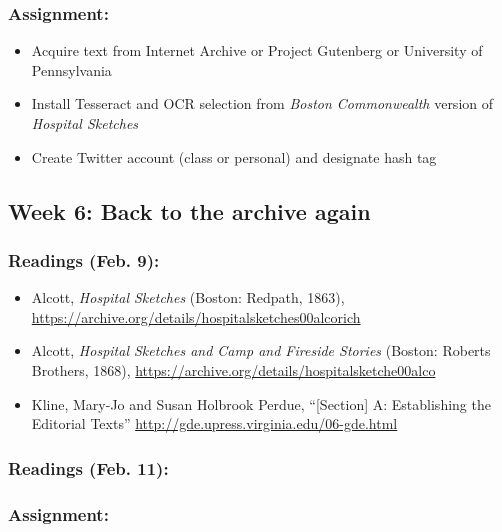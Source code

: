 \documentclass[]{article}
\begin{document}
\subsubsection{Assignment:}\label{assignment-3}

\begin{itemize}
\itemsep1pt\parskip0pt
\item
  Acquire text from Internet Archive or Project Gutenberg or University
  of Pennsylvania
\item
  Install Tesseract and OCR selection from \emph{Boston Commonwealth}
  version of \emph{Hospital Sketches}
\item
  Create Twitter account (class or personal) and designate hash tag
\end{itemize}

\subsection{Week 6: Back to the archive
again}\label{week-6-back-to-the-archive-again}

\subsubsection{Readings (Feb. 9):}\label{readings-feb.-9}

\begin{itemize}
\itemsep1pt\parskip0pt
\item
  Alcott, \emph{Hospital Sketches} (Boston: Redpath, 1863),
  \url{https://archive.org/details/hospitalsketches00alcorich}
\item
  Alcott, \emph{Hospital Sketches and Camp and Fireside Stories}
  (Boston: Roberts Brothers, 1868),
  \url{https://archive.org/details/hospitalsketche00alco}
\item
  Kline, Mary-Jo and Susan Holbrook Perdue, ``{[}Section{]} A:
  Establishing the Editorial Texts''
  \url{http://gde.upress.virginia.edu/06-gde.html}
\end{itemize}

\subsubsection{Readings (Feb. 11):}\label{readings-feb.-11}

\subsubsection{Assignment:}\label{assignment-4}
\end{document}
